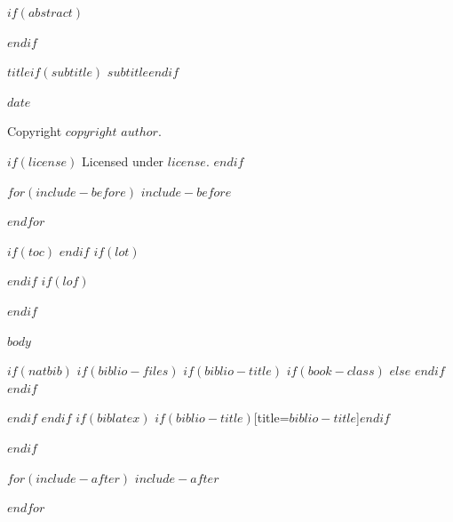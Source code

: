 \documentclass[$if(fontsize)$$fontsize$$else$12pt$endif$,$if(lang)$$lang$,$endif$$if(papersize)$$papersize$,$endif$$for(classoption)$$classoption$$sep$,$endfor$]{$documentclass$}
\begin{document}
\pagecolor{white}


$if(abstract)$
\begin{abstract}
$abstract$
\end{abstract}
$endif$


\vspace*{\fill}

\begin{center}

{\Large $title$$if(subtitle)$ $subtitle$$endif$}

$date$

Copyright $copyright$ $author$.

$if(license)$
Licensed under $license$.
$endif$


\end{center}

\vspace{1em}

$for(include-before)$
$include-before$

$endfor$

\vspace*{\fill}


$if(toc)$
{
\hypersetup{linkcolor=black}
\setcounter{tocdepth}{$if(toc-depth)$$toc-depth$$else$3$endif$}
\tableofcontents
}
$endif$
$if(lot)$
\listoftables
$endif$
$if(lof)$
\listoffigures
$endif$


$body$


$if(natbib)$
$if(biblio-files)$
$if(biblio-title)$
$if(book-class)$
\renewcommand\bibname{$biblio-title$}
$else$
\renewcommand\refname{$biblio-title$}
$endif$
$endif$


$endif$
$endif$
$if(biblatex)$
\printbibliography$if(biblio-title)$[title=$biblio-title$]$endif$

$endif$


$for(include-after)$
$include-after$

$endfor$

\end{document}
